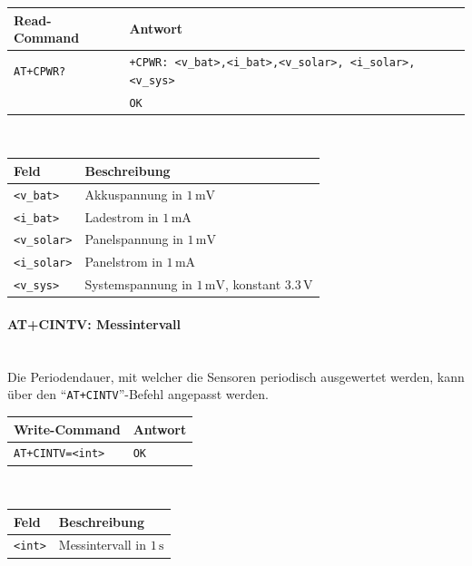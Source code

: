         \begin{table}[H]
            \centering
            \begin{tabular}{|p{}|p{}|}
                \hline
                \textbf{Read-Command} &\textbf{Antwort} \\
                \hline
                \texttt{AT+CPWR?}  & \texttt{+CPWR: <v\_bat>,<i\_bat>,<v\_solar>, <i\_solar>,<v\_sys>}\\
                & \texttt{OK}\\
                \hline
            \end{tabular}\\[3mm]
            \begin{tabular}{|p{}|p{}|}
                \hline
                \textbf{Feld}       & \textbf{Beschreibung}\\
                \hline
                \texttt{<v\_bat>}   & Akkuspannung in $1\,\mathrm{mV}$\\
                \texttt{<i\_bat>}   & Ladestrom in $1\,\mathrm{mA}$\\
                \texttt{<v\_solar>} & Panelspannung in $1\,\mathrm{mV}$\\
                \texttt{<i\_solar>} & Panelstrom in $1\,\mathrm{mA}$\\
                \texttt{<v\_sys>}   & Systemspannung in $1\,\mathrm{mV}$, konstant $3.3\,\mathrm{V}$\\
                \hline
            \end{tabular}
        \end{table}
        
        \paragraph{AT+CINTV: Messintervall}\mbox{}\\
        Die Periodendauer, mit welcher die Sensoren periodisch ausgewertet werden, kann über den ``\texttt{AT+CINTV}''-Befehl angepasst werden.
        
        \begin{table}[H]
            \centering
            \begin{tabular}{|p{}|p{}|}
                \hline
                \textbf{Write-Command} &\textbf{Antwort} \\
                \hline
                \texttt{AT+CINTV=<int>} & \texttt{OK}\\
                \hline
            \end{tabular}\\[3mm]
            \begin{tabular}{|p{}|p{}|}
                \hline
                \textbf{Feld}    & \textbf{Beschreibung}\\
                \hline
                \texttt{<int>}   & Messintervall in $1\,\mathrm{s}$\\
                \hline
            \end{tabular}
        \end{table}
    
